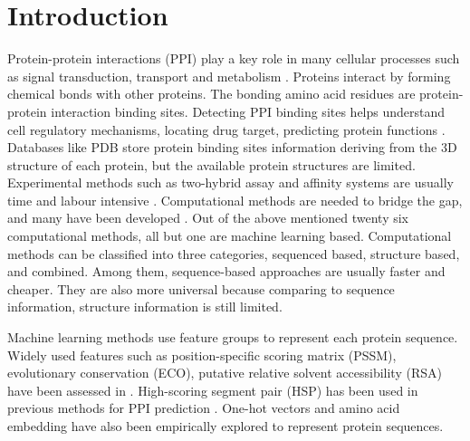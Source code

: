 \documentclass{bioinfo}
\begin{document}
\section{Introduction}
Protein-protein interactions (PPI) play a key role in many cellular processes such as signal transduction, transport and metabolism \citep{zhang2018review}. Proteins interact by forming chemical bonds with other proteins. The bonding amino acid residues are protein-protein interaction binding sites. Detecting PPI binding sites helps understand cell regulatory mechanisms, locating drug target, predicting protein functions \citep{bonetta2010interactome}. Databases like PDB \citep{berman2002protein} store protein binding sites information deriving from the 3D structure of each protein, but the available protein structures are limited. Experimental methods such as two-hybrid assay and affinity systems are usually time and labour intensive \citep{shoemaker2007deciphering}. Computational methods are needed to bridge the gap, and many have been developed \citep{cao2006enhanced, ofran2007isis, du2009improved, chen2009sequence, london2010structural, chen2010sequence, murakami2010applying, xue2011homppi, amos2011binding, jones2012psicov, asadabadi2013predictions, singh2014springs, wang2014fast, geng2015prediction, laine2015local, hwang2016hybrid, maheshwari2015prediction, liu2016prediction, wei2016protein, maheshwari2016template, jia2016ippbs, zhang2019sequence, wang2019protein, zhang2019scriber, zeng2019protein, xie2020prediction}. Out of the above mentioned twenty six computational methods, all but one are machine learning based. Computational methods can be classified into three categories, sequenced based, structure based, and combined. Among them, sequence-based approaches are usually faster and cheaper. They are also more universal because comparing to sequence information, structure information is still limited. 

Machine learning methods use feature groups to represent each protein sequence. Widely used features such as position-specific scoring matrix (PSSM), evolutionary conservation (ECO), putative relative solvent accessibility (RSA) have been assessed in \citep{zhang2019comprehensive}. High-scoring segment pair (HSP) has been used in previous methods for PPI prediction \citep{li2017sprint}. One-hot vectors \citep{zhang2019sequence, zeng2019protein} and amino acid embedding \citep{asgari2015continuous, heinzinger2019modeling, asgari2019probabilistic} have also been empirically explored to represent protein sequences.
\end{document}
